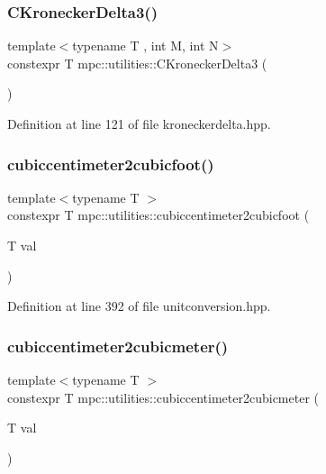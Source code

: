 \subsubsection{\texorpdfstring{C\+Kronecker\+Delta3()}{CKroneckerDelta3()}}
{\footnotesize\ttfamily template$<$typename T , int M, int N$>$ \\
constexpr T mpc\+::utilities\+::\+C\+Kronecker\+Delta3 (\begin{DoxyParamCaption}{ }\end{DoxyParamCaption})}



Definition at line 121 of file kroneckerdelta.\+hpp.

\mbox{\label{namespacempc_1_1utilities_a3dcb46dc0e3f7ff4709e37a0fd2d5b6f}} 
\subsubsection{\texorpdfstring{cubiccentimeter2cubicfoot()}{cubiccentimeter2cubicfoot()}}
{\footnotesize\ttfamily template$<$typename T $>$ \\
constexpr T mpc\+::utilities\+::cubiccentimeter2cubicfoot (\begin{DoxyParamCaption}\item[{T}]{val }\end{DoxyParamCaption})}



Definition at line 392 of file unitconversion.\+hpp.

\mbox{\label{namespacempc_1_1utilities_a4bff0fd9e5e1ca5607209f7d1f48c4fb}} 
\subsubsection{\texorpdfstring{cubiccentimeter2cubicmeter()}{cubiccentimeter2cubicmeter()}}
{\footnotesize\ttfamily template$<$typename T $>$ \\
constexpr T mpc\+::utilities\+::cubiccentimeter2cubicmeter (\begin{DoxyParamCaption}\item[{T}]{val }\end{DoxyParamCaption})}



